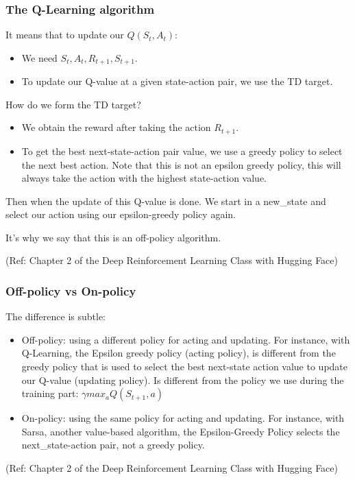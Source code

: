 \begin{frame}[fragile]\frametitle{The Q-Learning algorithm}

It means that to update our $Q(S_t, A_t)$:
\begin{itemize}
\item We need $S_t, A_t, R_{t+1}, S_{t+1}$.
\item To update our Q-value at a given state-action pair, we use the TD target.
\end{itemize}

How do we form the TD target?

\begin{itemize}
\item We obtain the reward after taking the action $R_{t+1}$.
\item To get the best next-state-action pair value, we use a greedy policy to select the next best action. Note that this is not an epsilon greedy policy, this will always take the action with the highest state-action value.
\end{itemize}

Then when the update of this Q-value is done. We start in a new\_state and select our action using our epsilon-greedy policy again.

It's why we say that this is an off-policy algorithm.

 
{\tiny (Ref: Chapter 2 of the Deep Reinforcement Learning Class with Hugging Face)}

\end{frame}

\begin{frame}[fragile]\frametitle{Off-policy vs On-policy}

The difference is subtle:

\begin{itemize}
\item Off-policy: using a different policy for acting and updating. For instance, with Q-Learning, the Epsilon greedy policy (acting policy), is different from the greedy policy that is used to select the best next-state action value to update our Q-value (updating policy). Is different from the policy we use during the training part: $\gamma max_a Q(S_{t+1},a)$

\item On-policy: using the same policy for acting and updating. For instance, with Sarsa, another value-based algorithm, the Epsilon-Greedy Policy selects the next\_state-action pair, not a greedy policy.

\end{itemize}


{\tiny (Ref: Chapter 2 of the Deep Reinforcement Learning Class with Hugging Face)}

\end{frame}

